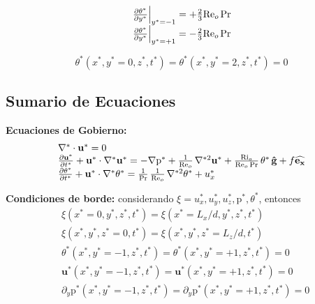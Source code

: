 \begin{align}
\begin{array}{l}
    \left. \frac{\partial \theta^*}{\partial y^*} \right\vert_{y^*=-1} = + \frac{2}{3} \text{Re}_o \hspace{0.5mm} \text{Pr} \\
    \left. \frac{\partial \theta^*}{\partial y^*} \right\vert_{y^*=+1} = - \frac{2}{3} \text{Re}_o \hspace{0.5mm} \text{Pr} 
\end{array}
\label{eq:neumann_adim}
\end{align}

\begin{equation}
\theta^*(x^*,y^*=0,z^*,t^*) = \theta^*(x^*,y^*=2,z^*,t^*) = 0
\label{eq:dirichlet_adim_theta}
\end{equation}



\subsection{Sumario de Ecuaciones}

\textbf{Ecuaciones de Gobierno:}
\begin{equation}
\begin{array}{l}
    \nabla^* \cdot \mathbf{u^*} = 0 \\
    \frac{\partial \mathbf{u^*}}{\partial t^*} + \mathbf{u^*} \cdot \nabla^* \mathbf{u^*} = 
    -\nabla \text{p}^* + \frac{1}{\text{Re}_o} \hspace{0.5mm} \nabla^{*2} \mathbf{u^*} + \frac{\text{Ri}_o}{\text{Re}_o \hspace{0.5mm} \text{Pr}} \hspace{0.5mm} \theta^* \hspace{0.5mm} \mathbf{\hat{g}} + f \mathbf{\widehat{e_x}}  \\
    \frac{\partial \theta^*}{\partial t^*} + \mathbf{u^*} \cdot \nabla^* \theta^* = 
    \frac{1}{\text{Pr}}\hspace{0.5mm}  \frac{1}{\text{Re}_o} \hspace{0.5mm} \nabla^{*2} \theta^* + u_x^* 
\end{array}
\label{eq:gob_system_res1}
\end{equation}

\textbf{Condiciones de borde:} considerando $\xi= u^*_x, u^*_y, u^*_z, \text{p}^*, \theta^*$, entonces
\begin{align}
&\xi(x^*=0,y^*,z^*,t^*) = \xi(x^*=L_x/d,y^*,z^*,t^*) 
	\label{eq:bc_1} \\
&\xi(x^*,y^*,z^*=0,t^*) = \xi(x^*,y^*,z^*=L_z/d,t^*) 
	\label{eq:bc_2} \\
&\theta^*(x^*,y^*=-1,z^*,t^*)       = \theta^*(x^*,y^*=+1,z^*,t^*) = 0
	\label{eq:bc_3} \\
&\mathbf{u^*}(x^*,y^*=-1,z^*,t^*)   = \mathbf{u^*}(x^*,y^*=+1,z^*,t^*) = 0
	\label{eq:bc_4} \\
&\partial_y \text{p}^*(x^*,y^*=-1,z^*,t^*) = \partial_y \text{p}^*(x^*,y^*=+1,z^*,t^*) = 0
	\label{eq:bc_5}
\end{align}


